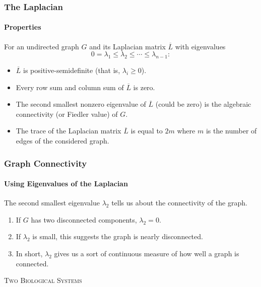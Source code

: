 \documentclass[aspectratio=43,leqno]{beamer}
\begin{document}
\begin{frame}
  \frametitle{The Laplacian}
  \framesubtitle{Properties}

  For an undirected graph $G$ and its Laplacian matrix $\overline{L}$ with eigenvalues 
\begin{displaymath}
0 = \lambda_1 \leq \lambda_2 \leq \cdots \leq \lambda_{n-1}:
\end{displaymath} 
\begin{itemize}
\item\label{item:3} $\overline{L}$ is positive-semidefinite (that is, $\lambda_i \geq 0$). \pause 
\item\label{item:28} Every row sum and column sum of $\overline{L}$ is zero. \pause
\item\label{item:29} The second smallest nonzero eigenvalue of $\overline{L}$ (could be zero) is the algebraic connectivity (or Fiedler value) of $G$. \pause
\item The trace of the Laplacian matrix $\overline{L}$ is equal to $2m$ where $m$ is the number of edges of the considered graph.
\end{itemize}
\end{frame} 

\begin{frame}
  \frametitle{Graph Connectivity}
  \framesubtitle{Using Eigenvalues of the Laplacian}

  The second smallest eigenvalue $\lambda_2$ tells us about the connectivity of the graph. \pause
\begin{enumerate}
\item\label{item:31} If $G$ has two disconnected components, $\lambda_2 = 0$. \pause
\item\label{item:32} If $\lambda_2$ is small, this suggests the graph is nearly disconnected. \pause
\item\label{item:33} In short, $\lambda_2$ gives us a sort of continuous measure of how well a graph is connected.
\end{enumerate}
\end{frame}


\begin{frame}
  \vfill
\begin{center}
  \textsc{Two Biological Systems}
\end{center}
  \vfill
\end{frame}
\end{document}
